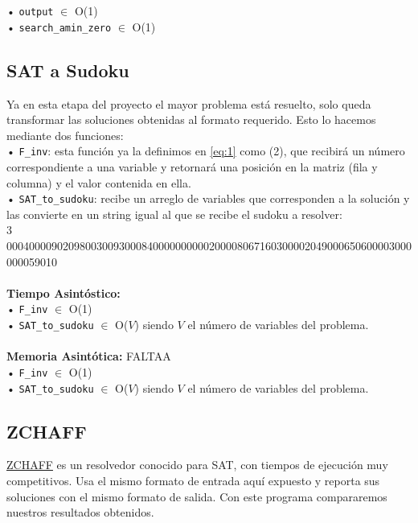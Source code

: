 \documentclass[letterpaper,12pt]{article}
\begin{document}
• \texttt{output} $\in$ O(1)\\

• \texttt{search\_amin\_zero} $\in$ O(1)\\

\subsection{SAT a Sudoku}

Ya en esta etapa del proyecto el mayor problema está resuelto, solo queda transformar las soluciones obtenidas al formato requerido. Esto lo hacemos mediante dos funciones:\\

• \texttt{F\_inv}: esta función ya la definimos en \ref{eq:1} como (2), que recibirá un número correspondiente a una variable y retornará una posición en la matriz (fila y columna) y el valor contenida en ella.\\

• \texttt{SAT\_to\_sudoku}: recibe un arreglo de variables que corresponden a la solución y las convierte en un string igual al que se recibe el sudoku a resolver:\\

\footnotesize{3 000400009020980030093000840000000000200008067160300002049000650600003000000059010}\\
\normalsize
\\
\textbf{Tiempo Asintóstico:}\\

• \texttt{F\_inv} $\in$ O(1)\\

• \texttt{SAT\_to\_sudoku} $\in$ O($V$) siendo $V$ el número de variables del problema.\\
\\
\textbf{Memoria Asintótica:} FALTAA\\ 

• \texttt{F\_inv} $\in$ O(1)\\

• \texttt{SAT\_to\_sudoku} $\in$ O($V$) siendo $V$ el número de variables del problema.\\

\subsection{ZCHAFF}

\href{https://www.princeton.edu/~chaff/zchaff.html}{ZCHAFF} es un resolvedor conocido para SAT, con tiempos de ejecución muy competitivos. Usa el mismo formato de entrada aquí expuesto y reporta sus soluciones con el mismo formato de salida. Con este programa compararemos nuestros resultados obtenidos.
\end{document}
